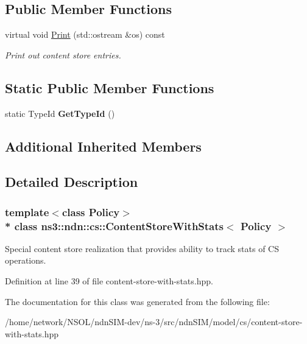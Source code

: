 \subsection*{Public Member Functions}
\begin{DoxyCompactItemize}
\item 
virtual void \hyperlink{classns3_1_1ndn_1_1cs_1_1ContentStoreWithStats_a77cd3d0ea40c01afb74a08750310fa9d}{Print} (std\+::ostream \&os) const\hypertarget{classns3_1_1ndn_1_1cs_1_1ContentStoreWithStats_a77cd3d0ea40c01afb74a08750310fa9d}{}\label{classns3_1_1ndn_1_1cs_1_1ContentStoreWithStats_a77cd3d0ea40c01afb74a08750310fa9d}

\begin{DoxyCompactList}\small\item\em Print out content store entries. \end{DoxyCompactList}\end{DoxyCompactItemize}
\subsection*{Static Public Member Functions}
\begin{DoxyCompactItemize}
\item 
static Type\+Id {\bfseries Get\+Type\+Id} ()\hypertarget{classns3_1_1ndn_1_1cs_1_1ContentStoreWithStats_af043b2b27d97bcfaa1176672001a10f2}{}\label{classns3_1_1ndn_1_1cs_1_1ContentStoreWithStats_af043b2b27d97bcfaa1176672001a10f2}

\end{DoxyCompactItemize}
\subsection*{Additional Inherited Members}


\subsection{Detailed Description}
\subsubsection*{template$<$class Policy$>$\\*
class ns3\+::ndn\+::cs\+::\+Content\+Store\+With\+Stats$<$ Policy $>$}

Special content store realization that provides ability to track stats of CS operations. 

Definition at line 39 of file content-\/store-\/with-\/stats.\+hpp.



The documentation for this class was generated from the following file\+:\begin{DoxyCompactItemize}
\item 
/home/network/\+N\+S\+O\+L/ndn\+S\+I\+M-\/dev/ns-\/3/src/ndn\+S\+I\+M/model/cs/content-\/store-\/with-\/stats.\+hpp\end{DoxyCompactItemize}
